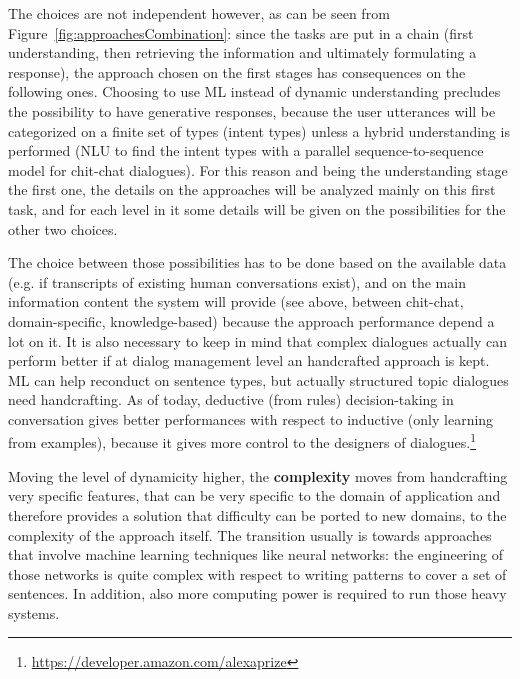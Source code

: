 The choices are not independent however, as can be seen from Figure~\ref{fig:approachesCombination}: since the tasks are put in a chain (first understanding, then retrieving the information and ultimately formulating a response), the approach chosen on the first stages has consequences on the following ones. Choosing to use ML instead of dynamic understanding precludes the possibility to have generative responses, because the user utterances will be categorized on a finite set of types (intent types) unless a hybrid understanding is performed (NLU to find the intent types with a parallel sequence-to-sequence model for chit-chat dialogues). For this reason and being the understanding stage the first one, the details on the approaches will be analyzed mainly on this first task, and for each level in it some details will be given on the possibilities for the other two choices.

The choice between those possibilities has to be done based on the available data (e.g. if transcripts of existing human conversations exist), and on the main information content the system will provide (see above, between chit-chat, domain-specific, knowledge-based) because the approach performance depend a lot on it. It is also necessary to keep in mind that complex dialogues actually can perform better if at dialog management level an handcrafted approach is kept. ML can help reconduct on sentence types, but actually structured topic dialogues need handcrafting. As of today, deductive (from rules) decision-taking in conversation gives better performances with respect to inductive (only learning from examples), because it gives more control to the designers of dialogues.\footnote{\url{https://developer.amazon.com/alexaprize}}

Moving the level of dynamicity higher, the \textbf{complexity} moves from handcrafting very specific features, that can be very specific to the domain of application and therefore provides a solution that difficulty can be ported to new domains, to the complexity of the approach itself. The transition usually is towards approaches that involve machine learning techniques like neural networks: the engineering of those networks is quite complex with respect to writing patterns to cover a set of sentences. In addition, also more computing power is required to run those heavy systems.

